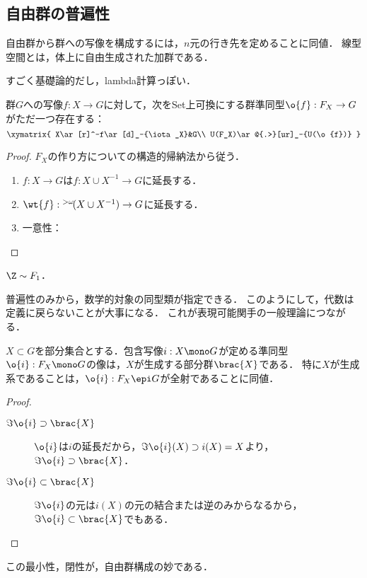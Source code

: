 \documentclass[uplatex,dvipdfmx]{jsreport}
\begin{document}
\subsection{自由群の普遍性}

\begin{tcolorbox}[colframe=ForestGreen, colback=ForestGreen!10!white,breakable,colbacktitle=ForestGreen!40!white,coltitle=black,fonttitle=\bfseries\sffamily,
title=]
    自由群から群への写像を構成するには，$n$元の行き先を定めることに同値．
    線型空間とは，体上に自由生成された加群である．

    すごく基礎論的だし，lambda計算っぽい．
\end{tcolorbox}

\begin{proposition}\label{prop-universality-of-free-group}
    群$G$への写像$f:X\to G$に対して，次をSet上可換にする群準同型$\o{f}:F_X\to G$がただ一つ存在する：
    \[\xymatrix{
        X\ar[r]^-f\ar[d]_-{\iota_X}&G\\
        U(F_X)\ar@{.>}[ur]_-{U(\o{f})}
    }\]
\end{proposition}
\begin{proof}
    $F_X$の作り方についての構造的帰納法から従う．
    \begin{enumerate}
        \item $f:X\to G$は$f:X\cup X^{-1}\to G$に延長する．
        \item $\wt{f}:{}^{>\omega}\!(X\cup X^{-1})\to G$に延長する．
        \item 一意性：
    \end{enumerate}
\end{proof}

\begin{corollary}
    $\Z\sim F_1$．
\end{corollary}
\begin{remarks}
    普遍性のみから，数学的対象の同型類が指定できる．
    このようにして，代数は定義に戻らないことが大事になる．
    これが表現可能関手の一般理論につながる．
\end{remarks}

\begin{proposition}[生成の特徴付け]\label{prop-characterization-of-generated-subgroup}
    $X\subset G$を部分集合とする．包含写像$i:X\mono G$が定める準同型$\o{i}:F_X\mono G$の像は，$X$が生成する部分群$\brac{X}$である．
    特に$X$が生成系であることは，$\o{i}:F_X\epi G$が全射であることに同値．
\end{proposition}
\begin{proof}\mbox{}
    \begin{description}
        \item[$\Im\o{i}\supset\brac{X}$] $\o{i}$は$i$の延長だから，$\Im\o{i}(X)\supset i(X)=X$より，$\Im\o{i}\supset\brac{X}$．
        \item[$\Im\o{i}\subset\brac{X}$] $\Im\o{i}$の元は$i(X)$の元の結合または逆のみからなるから，$\Im\o{i}\subset\brac{X}$でもある．
    \end{description}
\end{proof}
\begin{remarks}
    この最小性，閉性が，自由群構成の妙である．
\end{remarks}
\end{document}
